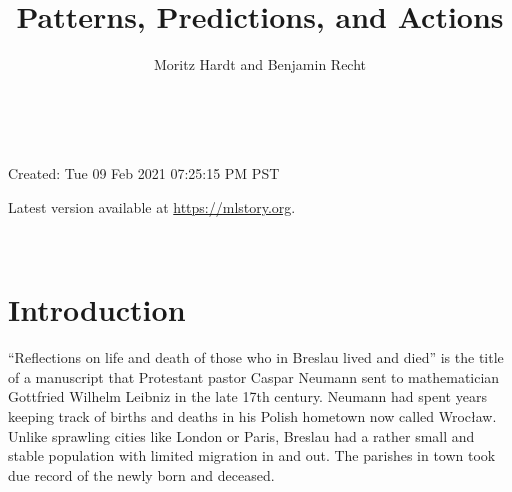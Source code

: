 \documentclass{tufte-book}
\title{Patterns, Predictions, and Actions}
\author{Moritz Hardt and Benjamin Recht}
\newif\ifshowchapternumber
\begin{document}
\frontmatter

\showchapternumberfalse

\thispagestyle{empty}

\begin{fullwidth}

~\vspace{2cm}


\vspace{1cm}


\vspace{4cm}


\pagebreak

\thispagestyle{empty}

\vspace{2cm}


\vspace{2cm}

\noindent Created: Tue 09 Feb 2021 07:25:15 PM PST

\vspace{2cm}

\noindent Latest version available at \url{https://mlstory.org}.

\noindent 

\pagebreak

\thispagestyle{empty}

~

\vspace{4cm}


\pagebreak

\thispagestyle{empty}

\end{fullwidth}

\tableofcontents

\mainmatter

\showchapternumbertrue

\chapter{Introduction}

``Reflections on life and death of those who in Breslau lived and died''
is the title of a manuscript that Protestant pastor Caspar Neumann sent
to mathematician Gottfried Wilhelm Leibniz in the late 17th century.
Neumann had spent years keeping track of births and deaths in his Polish
hometown now called Wrocław. Unlike sprawling cities like London or
Paris, Breslau had a rather small and stable population with limited
migration in and out. The parishes in town took due record of the newly
born and deceased.
\end{document}
